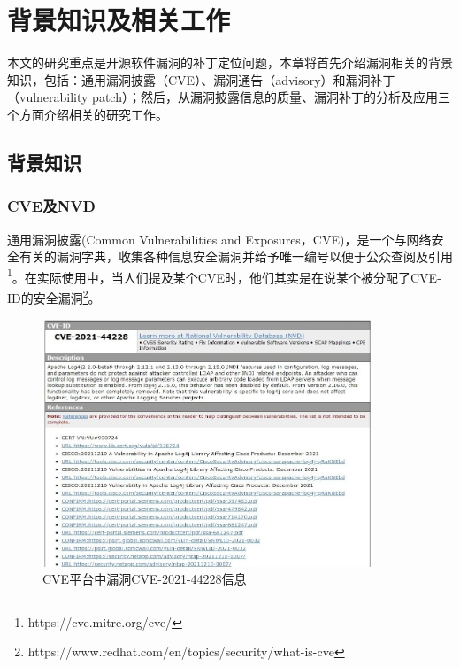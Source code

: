 \chapter{背景知识及相关工作}
本文的研究重点是开源软件漏洞的补丁定位问题，本章将首先介绍漏洞相关的背景知识，包括：通用漏洞披露（CVE）、漏洞通告（advisory）和漏洞补丁（vulnerability patch）；然后，从漏洞披露信息的质量、漏洞补丁的分析及应用三个方面介绍相关的研究工作。


\section{背景知识}

\subsection{CVE及NVD} 
通用漏洞披露(Common Vulnerabilities and Exposures，CVE)\cite{mitre2021:cve}，是一个与网络安全有关的漏洞字典，收集各种信息安全漏洞并给予唯一编号以便于公众查阅及引用\footnote{https://cve.mitre.org/cve/}。在实际使用中，当人们提及某个CVE时，他们其实是在说某个被分配了CVE-ID的安全漏洞\footnote{https://www.redhat.com/en/topics/security/what-is-cve}。
\begin{figure}[h]
    \centering
    \includegraphics[width=0.88\textwidth]{res/CVE-2021-44228-2}
    \caption{CVE平台中漏洞CVE-2021-44228信息}
    \label{fig:CVE-2021-44228}
\end{figure}

